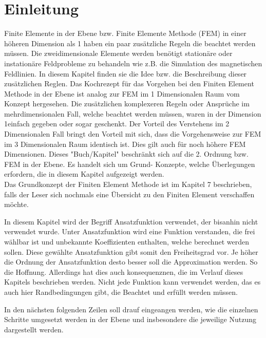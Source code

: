 %
%
%
\section{Einleitung\label{fem:section:einleitung}}
Finite Elemente in der Ebene bzw. Finite Elemente Methode (FEM) in einer höheren Dimension als 1 haben ein paar zusätzliche Regeln die beachtet werden müssen. Die zweidimensionale Elemente werden benötigt stationäre oder instationäre Feldprobleme zu behandeln wie z.B. die Simulation des magnetischen Feldlinien. In diesem Kapitel finden sie die Idee bzw. die Beschreibung dieser zusätzlichen Reglen. Das Kochrezept für das Vorgehen bei den Finiten Element Methode in der Ebene ist analog zur FEM im 1 Dimensionalen Raum vom Konzept hergesehen. Die zusätzlichen komplexeren Regeln oder Ansprüche im mehrdimensionalen Fall, welche beachtet werden müssen, waren in der Dimension 1einfach gegeben oder sogar geschenkt. Der Vorteil des Verstehens im 2 Dimensionalen Fall bringt den Vorteil mit sich, dass die Vorgehensweise zur FEM im 3 Dimensionalen Raum identisch ist. Dies gilt auch für noch höhere FEM Dimensionen. Dieses  "Buch/Kapitel" beschränkt sich auf die 2. Ordnung bzw. FEM in der Ebene. Es handelt sich um Grund- Konzepte, welche Überlegungen erfordern, die in diesem Kapitel aufgezeigt werden.\\

Das Grundkonzept der Finiten Element Methode ist im Kapitel 7 beschrieben, falls der Leser sich nochmals eine Übersicht zu den Finiten Element verschaffen möchte.

In diesem Kapitel wird der Begriff Ansatzfunktion verwendet, der bisanhin nicht verwendet wurde. Unter Ansatzfunktion wird eine Funktion verstanden, die frei wählbar ist und unbekannte Koeffizienten enthalten, welche berechnet werden sollen. Diese gewählte Ansatzfunktion gibt somit den Freiheitsgrad vor. Je höher die Ordnung der Ansatzfunktion desto besser soll die Approximation werden. So die Hoffnung. Allerdings hat dies auch konsequenznen, die im Verlauf dieses Kapitels beschrieben werden. Nicht jede Funktion kann verwendet werden, das es auch hier Randbedingungen gibt, die Beachtet und erfüllt werden müssen. 

In den nächsten folgenden Zeilen soll drauf eingeangen werden, wie die einzelnen Schritte umgesetzt werden in der Ebene und insbesondere die jeweilige Nutzung dargestellt werden.

